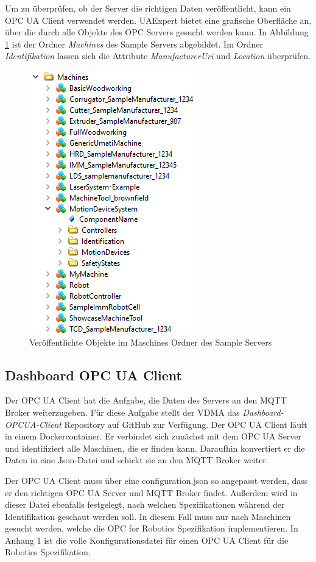 \documentclass[a4paper, 12pt, oneside, toc=listofnumbered, bibliography=totoc]{scrbook}
\begin{document}
		Um zu überprüfen, ob der Server die richtigen Daten veröffentlicht, kann ein OPC UA Client verwendet werden. UAExpert bietet eine grafische Oberfläche an, über die durch alle Objekte des OPC Servers gesucht werden kann. In Abbildung \ref{fig:UAExpert} ist der Ordner \textit{Machines} des Sample Servers abgebildet. Im Ordner \textit{Identifikation} lassen sich die Attribute \textit{ManufacturerUri} und \textit{Location} überprüfen.
		
		\begin{figure}[H]
			\centering
			\includegraphics[height=0.7\linewidth]{res/UAExpert.png}
			\caption{Veröffentlichte Objekte im Maschines Ordner des Sample Servers}
			\label{fig:UAExpert}
		\end{figure}
		
		\subsection{Dashboard OPC UA Client}\label{ch:OPCClient}
		
		Der OPC UA Client hat die Aufgabe, die Daten des Servers an den MQTT Broker weiterzugeben. Für diese Aufgabe stellt der VDMA das \textit{Dashboard-OPCUA-Client} Repository auf GitHub zur Verfügung. Der OPC UA Client läuft in einem Dockercontainer. Er verbindet sich zunächst mit dem OPC UA Server und identifiziert alle Maschinen, die er finden kann. Daraufhin konvertiert er die Daten in eine Json-Datei und schickt sie an den MQTT Broker weiter.
		
		Der OPC UA Client muss über eine configuration.json so angepasst werden, dass er den richtigen OPC UA Server und MQTT Broker findet. Außerdem wird in dieser Datei ebenfalls festgelegt, nach welchen Spezifikationen während der Identifikation geschaut werden soll. In diesem Fall muss nur nach Maschinen gesucht werden, welche die OPC for Robotics Spezifikation implementieren. In Anhang 1 ist die volle Konfigurationsdatei für einen OPC UA Client für die Robotics Spezifikation.
		
\end{document}

